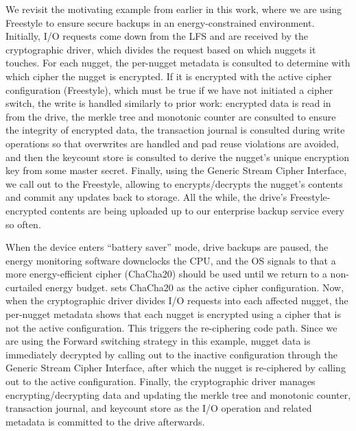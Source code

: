 We revisit the motivating example from earlier in this work, where we
are using Freestyle to ensure secure backups in an energy-constrained
environment.  Initially, I/O requests come down from the LFS and are
received by the cryptographic driver, which divides the request based
on which nuggets it touches. For each nugget, the per-nugget metadata
is consulted to determine with which cipher the nugget is encrypted.
If it is encrypted with the active cipher configuration (Freestyle),
which must be true if we have not initiated a cipher switch, the write
is handled similarly to prior work: encrypted data is read in from the
drive, the merkle tree and monotonic counter are consulted to ensure
the integrity of encrypted data, the transaction journal is consulted
during write operations so that overwrites are handled and pad reuse
violations are avoided, and then the keycount store is consulted to
derive the nugget's unique encryption key from some master secret.
Finally, using the Generic Stream Cipher Interface, we call out to the
Freestyle, allowing \sys{} to encrypts/decrypts the nugget's
contents and commit any updates back to storage.  All the while, the
drive's Freestyle-encrypted contents are being uploaded up to our
enterprise backup service every so often. 

When the device enters ``battery saver'' mode, drive backups are paused, the
energy monitoring software downclocks the CPU, and the OS signals to \sys{}
that a more energy-efficient cipher (ChaCha20) should be used until we return to
a non-curtailed energy budget. \sys{} sets ChaCha20 as the active cipher
configuration. Now, when the cryptographic driver divides I/O requests into each
affected nugget, the per-nugget metadata shows \sys{} that each nugget is
encrypted using a cipher that is not the active configuration. This triggers the
re-ciphering code path. Since we are using the Forward switching strategy in
this example, nugget data is immediately decrypted by calling out to the
inactive configuration through the Generic Stream Cipher Interface, after which
the nugget is re-ciphered by calling out to the active configuration. Finally,
the cryptographic driver manages encrypting/decrypting data and updating the
merkle tree and monotonic counter, transaction journal, and keycount store as
the I/O operation and related metadata is committed to the drive afterwards.

